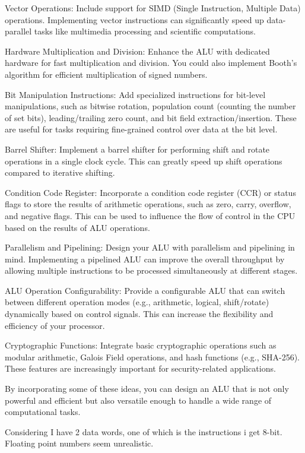     Vector Operations: Include support for SIMD (Single Instruction, Multiple Data) operations. Implementing vector instructions can significantly speed up data-parallel tasks like multimedia processing and scientific computations.

    Hardware Multiplication and Division: Enhance the ALU with dedicated hardware for fast multiplication and division. You could also implement Booth's algorithm for efficient multiplication of signed numbers.

    Bit Manipulation Instructions: Add specialized instructions for bit-level manipulations, such as bitwise rotation, population count (counting the number of set bits), leading/trailing zero count, and bit field extraction/insertion. These are useful for tasks requiring fine-grained control over data at the bit level.

    Barrel Shifter: Implement a barrel shifter for performing shift and rotate operations in a single clock cycle. This can greatly speed up shift operations compared to iterative shifting.

    Condition Code Register: Incorporate a condition code register (CCR) or status flags to store the results of arithmetic operations, such as zero, carry, overflow, and negative flags. This can be used to influence the flow of control in the CPU based on the results of ALU operations.

    Parallelism and Pipelining: Design your ALU with parallelism and pipelining in mind. Implementing a pipelined ALU can improve the overall throughput by allowing multiple instructions to be processed simultaneously at different stages.

    ALU Operation Configurability: Provide a configurable ALU that can switch between different operation modes (e.g., arithmetic, logical, shift/rotate) dynamically based on control signals. This can increase the flexibility and efficiency of your processor.

    Cryptographic Functions: Integrate basic cryptographic operations such as modular arithmetic, Galois Field operations, and hash functions (e.g., SHA-256). These features are increasingly important for security-related applications.

By incorporating some of these ideas, you can design an ALU that is not only powerful and efficient but also versatile enough to handle a wide range of computational tasks.

Considering I have 2 data words, one of which is the instructions i get 8-bit. Floating point numbers seem unrealistic. 

